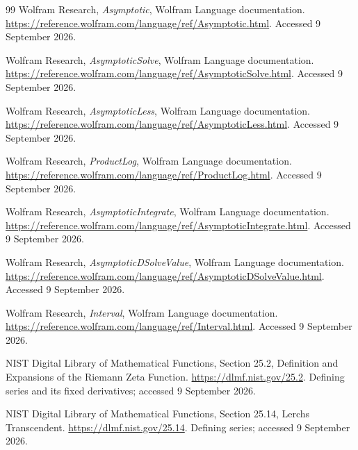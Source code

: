 \documentclass[11pt,a4paper]{article}
\begin{document}
\begin{thebibliography}{99}
 Wolfram Research, \emph{Asymptotic}, Wolfram Language documentation. \url{https://reference.wolfram.com/language/ref/Asymptotic.html}. Accessed 9 September 2026.

 Wolfram Research, \emph{AsymptoticSolve}, Wolfram Language documentation. \url{https://reference.wolfram.com/language/ref/AsymptoticSolve.html}. Accessed 9 September 2026.

 Wolfram Research, \emph{AsymptoticLess}, Wolfram Language documentation. \url{https://reference.wolfram.com/language/ref/AsymptoticLess.html}. Accessed 9 September 2026.

 Wolfram Research, \emph{ProductLog}, Wolfram Language documentation. \url{https://reference.wolfram.com/language/ref/ProductLog.html}. Accessed 9 September 2026.

 Wolfram Research, \emph{AsymptoticIntegrate}, Wolfram Language documentation. \url{https://reference.wolfram.com/language/ref/AsymptoticIntegrate.html}. Accessed 9 September 2026.

 Wolfram Research, \emph{AsymptoticDSolveValue}, Wolfram Language documentation. \url{https://reference.wolfram.com/language/ref/AsymptoticDSolveValue.html}. Accessed 9 September 2026.

 Wolfram Research, \emph{Interval}, Wolfram Language documentation. \url{https://reference.wolfram.com/language/ref/Interval.html}. Accessed 9 September 2026.

 NIST Digital Library of Mathematical Functions, Section 25.2, Definition and Expansions of the Riemann Zeta Function. \url{https://dlmf.nist.gov/25.2}. Defining series and its fixed derivatives; accessed 9 September 2026.

 NIST Digital Library of Mathematical Functions, Section 25.14, Lerch\textquotesingle s Transcendent. \url{https://dlmf.nist.gov/25.14}. Defining series; accessed 9 September 2026.
\end{thebibliography}
\end{document}
